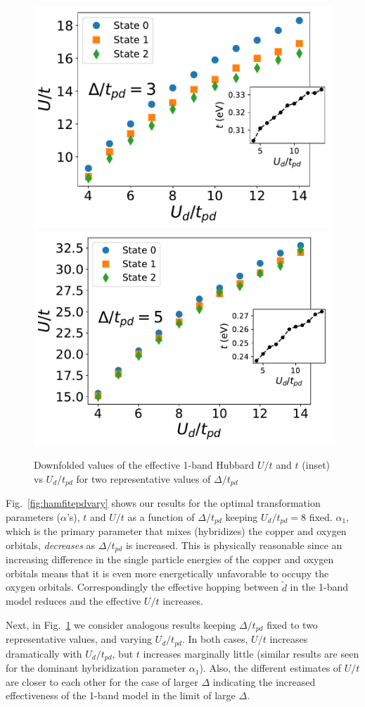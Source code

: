 \begin{figure}[]
\centering
\includegraphics[width=0.48\linewidth]{./Figures/U_and_hopping_combined_vs_Ud_ep_3.pdf}
\includegraphics[width=0.50\linewidth]{./Figures/U_and_hopping_combined_vs_Ud_ep_5.pdf}
\caption{Downfolded values of the effective 1-band Hubbard $U/t$ and $t$ (inset) 
vs $U_d/t_{pd}$ for two representative values of $\Delta/t_{pd}$}
\label{fig:hamfitUdvary} 
\end{figure}	
 
Fig.~\ref{fig:hamfitepdvary} shows our results for the optimal 
transformation parameters ($\alpha$'s), $t$ and $U/t$ as a function of $\Delta/t_{pd}$
keeping $U_d/t_{pd}=8$ fixed. $\alpha_1$, which is the primary parameter that mixes (hybridizes) 
the copper and oxygen orbitals, \textit{decreases} as $\Delta/t_{pd}$ is increased. 
This is physically reasonable since an increasing difference in the single particle energies of the copper and oxygen orbitals 
means that it is even more energetically unfavorable to occupy the oxygen orbitals. 
Correspondingly the effective hopping between $\tilde{d}$ in the 
1-band model reduces and the effective $U/t$ increases. 

Next, in Fig.~\ref{fig:hamfitUdvary} we consider analogous results keeping $\Delta/t_{pd}$ fixed to two representative values, 
and varying $U_d/t_{pd}$. In both cases, $U/t$ increases dramatically with $U_d/t_{pd}$, but $t$ 
increases marginally little (similar results are seen for the dominant 
hybridization parameter $\alpha_1$). Also, the different estimates of $U/t$ are closer to each other 
for the case of larger $\Delta$ indicating the increased effectiveness of the 1-band model 
in the limit of large $\Delta$. 

